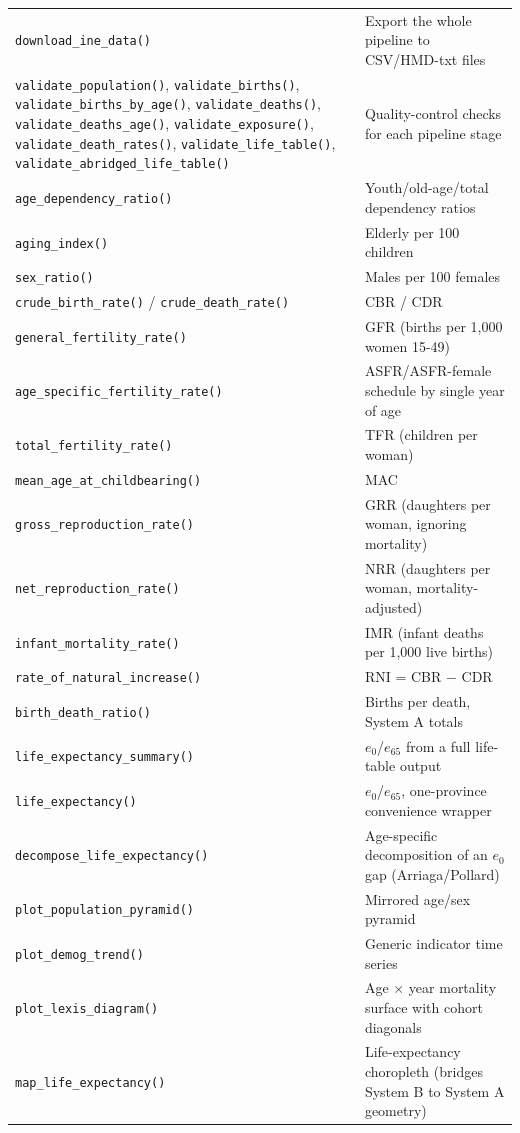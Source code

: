 \documentclass[11pt]{article}
\newcommand{\fn}[1]{\texttt{#1}}
\begin{document}
\begin{longtable}{@{}p{5.3cm}p{9.5cm}@{}}
\fn{download\_ine\_data()} & Export the whole pipeline to CSV/HMD-txt files \\
\fn{validate\_population()}, \fn{validate\_births()}, \fn{validate\_births\_by\_age()}, \fn{validate\_deaths()}, \fn{validate\_deaths\_age()}, \fn{validate\_exposure()}, \fn{validate\_death\_rates()}, \fn{validate\_life\_table()}, \fn{validate\_abridged\_life\_table()} & Quality-control checks for each pipeline stage \\
\fn{age\_dependency\_ratio()} & Youth/old-age/total dependency ratios \\
\fn{aging\_index()} & Elderly per 100 children \\
\fn{sex\_ratio()} & Males per 100 females \\
\fn{crude\_birth\_rate()} / \fn{crude\_death\_rate()} & CBR / CDR \\
\fn{general\_fertility\_rate()} & GFR (births per 1,000 women 15-49) \\
\fn{age\_specific\_fertility\_rate()} & ASFR/ASFR-female schedule by single year of age \\
\fn{total\_fertility\_rate()} & TFR (children per woman) \\
\fn{mean\_age\_at\_childbearing()} & MAC \\
\fn{gross\_reproduction\_rate()} & GRR (daughters per woman, ignoring mortality) \\
\fn{net\_reproduction\_rate()} & NRR (daughters per woman, mortality-adjusted) \\
\fn{infant\_mortality\_rate()} & IMR (infant deaths per 1,000 live births) \\
\fn{rate\_of\_natural\_increase()} & RNI = CBR $-$ CDR \\
\fn{birth\_death\_ratio()} & Births per death, System A totals \\
\fn{life\_expectancy\_summary()} & $e_0$/$e_{65}$ from a full life-table output \\
\fn{life\_expectancy()} & $e_0$/$e_{65}$, one-province convenience wrapper \\
\fn{decompose\_life\_expectancy()} & Age-specific decomposition of an $e_0$ gap (Arriaga/Pollard) \\
\fn{plot\_population\_pyramid()} & Mirrored age/sex pyramid \\
\fn{plot\_demog\_trend()} & Generic indicator time series \\
\fn{plot\_lexis\_diagram()} & Age $\times$ year mortality surface with cohort diagonals \\
\fn{map\_life\_expectancy()} & Life-expectancy choropleth (bridges System B to System A geometry) \\
\bottomrule
\end{longtable}
\end{document}
